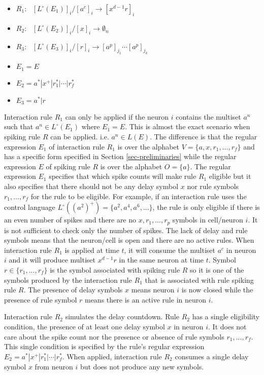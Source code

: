 \documentclass[a4paper]{article}
\theoremstyle{definition}
\newcommand{\ra}{\rightarrow}
\newcommand{\ts}{\text{ }}
\begin{document}
\begin{multicols}{2}
\begin{itemize}
\item $R_1:\ts [L^{\circ}(E_1)]_i / [a^c]_i \ra [x^{d-1}r]_i$ 
\item $R_2:\ts [L^{\circ}(E_2)]_i / [x]_i \ra \emptyset_n$
\item $R_3:\ts [L^{\circ}(E_3)]_i / [r]_i  \ra [a^p]_{j_1}\cdots[a^p]_{j_k}$ 
\item $E_1 = E$
\item $E_2 = a^*|x^+|r_1^*|\cdots|r_f^*$
\item $E_3 = a^*|r$
\end{itemize}
\end{multicols}

Interaction rule $R_1$ can only be applied if the neuron $i$ contains the multiset $a^n$ such that 
$a^n \in L^{\circ}(E_1)$ where $E_1=E$. This is almost the exact scenario when spiking rule $R$ can
be applied. i.e. $a^n \in L(E)$. The difference is that the regular expression $E_1$ of interaction
rule $R_1$ is over the alphabet $V=\{a,x,r_1,...,r_f\}$ and has a specific form specified in Section 
\ref{sec-preliminaries} while the regular expression $E$ of spiking rule $R$ is over the alphabet 
$O=\{a\}$. The regular expression $E_1$ specifies that which  spike counts will make rule $R_1$
eligible but it also specifies that there should not be any delay symbol $x$ nor rule symbols
$r_1,...,r_f$ for the rule to be eligible. For example, if an interaction rule uses the control
language $L^{\circ}((a^2)^+) = \{a^2,a^4,a^6,...\}$, the rule is only eligible if there is an even
number of spikes and there are no $x,r_1,...,r_p$ symbols in cell/neuron $i$. It is not sufficient
to check only the number of spikes. The lack of delay and rule symbols means that the neuron/cell
is open and there are no active rules. When interaction rule $R_1$ is applied at time $t$, it will 
consume the multiset $a^c$ in neuron $i$ and it will produce multiset $x^{d-1}r$ in the same neuron
at time $t$. Symbol $r \in \{r_1,...,r_f\}$ is the symbol associated with spiking rule $R$ so it is
one of the symbols produced by the interaction rule $R_1$ that is associated with rule spiking rule
$R$. The presence of delay symbols $x$ means neuron $i$ is now closed while the presence of rule
symbol $r$ means there is an active rule in neuron $i$.

Interaction rule $R_2$ simulates the delay countdown. Rule $R_2$ has a single eligibility condition,
the presence of at least one delay symbol $x$ in neuron $i$. It does not care about the spike count
nor the presence or absence of rule symbols $r_1,...,r_f$. This single condition is specified by the 
rule's regular expression $E_2 = a^*|x^+|r_1^*|\cdots|r_f^*$. When applied, interaction rule $R_2$ 
consumes a single delay symbol $x$ from neuron $i$ but does not produce any new symbols.
\end{document}
